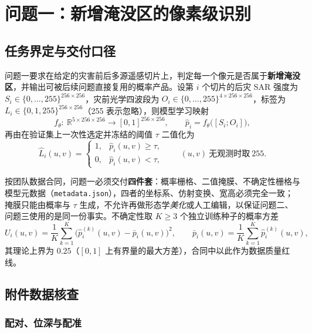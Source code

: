 \section{问题一：新增淹没区的像素级识别}
\label{sec:q1}

\subsection{任务界定与交付口径}

问题一要求在给定的灾害前后多源遥感切片上，判定每一个像元是否属于\textbf{新增淹没区}，并输出可被后续问题直接复用的概率产品。设第 $i$ 个切片的后灾 SAR 强度为 $S_i\in\{0,\dots,255\}^{256\times256}$，灾前光学四波段为 $O_i\in\{0,\dots,255\}^{4\times256\times256}$，标签为 $L_i\in\{0,1,255\}^{256\times256}$（255 表示忽略），则模型学习映射
\begin{equation}
f_\theta:\ \mathbb{R}^{5\times256\times256}\longrightarrow[0,1]^{256\times256},
\qquad \hat p_i=f_\theta\big([S_i;O_i]\big),
\label{eq:q1-map}
\end{equation}
再由在验证集上一次性选定并冻结的阈值 $\tau$ 二值化为
\begin{equation}
\hat L_i(u,v)=
\begin{cases}
1, & \hat p_i(u,v)\ge\tau,\\[2pt]
0, & \hat p_i(u,v)<\tau,
\end{cases}
\qquad (u,v)\ \text{无观测时取}\ 255 .
\label{eq:q1-mask}
\end{equation}

按团队数据合同，问题一必须交付\textbf{四件套}：概率栅格、二值掩膜、不确定性栅格与模型元数据（\texttt{metadata.json}），四者的坐标系、仿射变换、宽高必须完全一致；掩膜只能由概率与 $\tau$ 生成，不允许再做形态学\emph{美化}或人工编辑，以保证问题二、问题三使用的是同一份事实。不确定性取 $K\ge3$ 个独立训练种子的概率方差
\begin{equation}
U_i(u,v)=\frac{1}{K}\sum_{k=1}^{K}\Big(\hat p_i^{(k)}(u,v)-\bar p_i(u,v)\Big)^2,
\qquad \bar p_i(u,v)=\frac{1}{K}\sum_{k=1}^{K}\hat p_i^{(k)}(u,v),
\label{eq:q1-unc}
\end{equation}
其理论上界为 $0.25$（$[0,1]$ 上有界量的最大方差），合同中以此作为数据质量红线。

\subsection{附件数据核查}
\label{sec:q1-audit}

\subsubsection{配对、位深与配准}

